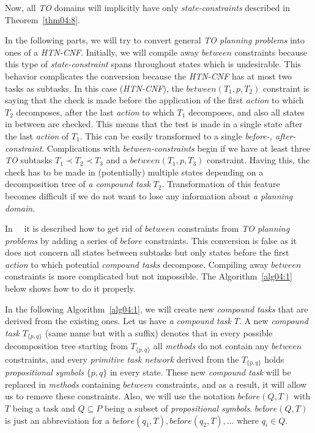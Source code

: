 \medskip\noindent
Now, all \emph{TO} domains will implicitly have only \emph{state-constraints} described in Theorem~\ref{thm04:8}.

\medskip\noindent\label{rem-between-two-tasks}
In the following parts, we will try to convert general \emph{TO planning problems} into ones of a \emph{HTN-CNF}. Initially, we will compile away $between$ constraints because this type of \emph{state-constraint} spans throughout states which is undesirable. This behavior complicates the conversion because the \emph{HTN-CNF} has at most two tasks as subtasks. In this case (\emph{HTN-CNF}), the $between(T_1, p, T_2)$ constraint is saying that the check is made before the application of the first \emph{action} to which $T_2$ decomposes, after the last \emph{action} to which $T_1$ decomposes, and also all states in between are checked. This means that the test is made in a single state after the last \emph{action} of $T_1$. This can be easily transformed to a single \emph{before-, after-constraint}. Complications with \emph{between-constraints} begin if we have at least three \emph{TO} subtasks $T_1 \prec T_2 \prec T_3$ and a $between(T_1, p, T_3)$ constraint. Having this, the check has to be made in (potentially) multiple states depending on a decomposition tree of \emph{a compound task} $T_2$. Transformation of this feature becomes difficult if we do not want to lose any information about \emph{a planning domain}.

\medskip\noindent
In~\cite{ondrckova2023semantics}~\cite{ondrckova2024empty} it is described how to get rid of $between$ constraints from \emph{TO planning problems} by adding a series of $be\text{f}ore$ constraints. This conversion is false as it does not concern all states between subtasks but only states before the first \emph{action} to which potential \emph{compound tasks} decompose. Compiling away $between$ constraints is more complicated but not impossible. The Algorithm~\ref{alg04:1} below shows how to do it properly.

\medskip\noindent
In the following Algorithm~\ref{alg04:1}, we will create new \emph{compound tasks} that are derived from the existing ones. Let us have \emph{a compound task} $T$. A new \emph{compound task} $T_{\{p, q\}}$ (same name but with a suffix) denotes that in every possible decomposition tree starting from $T_{\{p, q\}}$ all \emph{methods} do not contain any $between$ constraints, and every \emph{primitive task network} derived from the $T_{\{p, q\}}$ holds \emph{propositional symbols} $\{p, q\}$ in every state. These new \emph{compound task} will be replaced in \emph{methods} containing $between$ constraints, and as a result, it will allow us to remove these constraints. Also, we will use the notation $be\text{f}ore(Q, T)$ with $T$ being a task and $Q \subseteq P$ being a subset of \emph{propositional symbols}. $be\text{f}ore(Q, T)$ is just an abbreviation for a $be\text{f}ore(q_1, T), be\text{f}ore(q_2, T), \dots$ where $q_i \in Q$.

